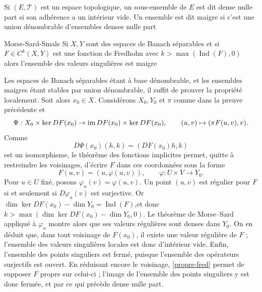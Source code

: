 \documentclass[memoire.tex]{subfiles}
\begin{document}
\begin{definition}
    Si $(E,\mathcal{T})$ est un espace topologique, un sous-ensemble de $E$ est dit \textcolor{color-def}{dense nulle part} si son adhérence  a un intérieur vide. Un ensemble est dit \textcolor{color-def}{maigre} si c'est une union dénombrable d'ensembles denses nulle part
\end{definition}
\begin{theobox}{Morse-Sard-Smale}{}
    Si $X,Y$ sont des espaces de Banach séparables et si $F\in C^k(X,Y)$ est une fonction de 
    Fredholm avec $k>\max(\operatorname*{Ind}(F),0)$
    alors l'ensemble des valeurs singulières est maigre
\end{theobox}
\begin{preuve}
Les espaces de Banach séparables étant à base dénombrable, et les ensembles maigres étant stables par union dénombrable, il suffit de prouver la propriété localement. Soit alors $x_0\in X$.  Considérons $X_0,Y_0$ et $\pi$ comme dans la preuve précédente et 
\begin{equation*}
    \Psi:X_0\times\ker DF(x_0)\rightarrow
    \operatorname{im} DF(x_0)\times\ker DF(x_0),\qquad
    (u,v)\mapsto(\pi F(u,v),v).
\end{equation*}
Comme
\begin{equation*}
    D\Psi(x_0)(h,k)=(DF(x_0)h,k)
\end{equation*}
est un isomorphisme, le théorème des fonctions implicites permet, quitte à restreindre les voisinages, d'écrire $F$ dans ces coordonnées sous la forme
\begin{equation*}
    F(u,v)=(u,\varphi(u,v)),
    \qquad
    \varphi:U\times V\rightarrow Y_0.
\end{equation*}
Pour $u\in U$ fixé, posons $\varphi_u(v)=\varphi(u,v)$. Un point $(u,v)$ est régulier pour $F$ si et seulement si $D\varphi_u(v)$ est surjective. Or $\dim\ker DF(x_0)-\dim Y_0=\operatorname{Ind}(F)$,et donc $k>\max(\dim\ker DF(x_0)-\dim Y_0,0)$. Le théorème de Morse--Sard appliqué à $\varphi_u$ montre alors que ses valeurs régulières sont denses dans $Y_0$. On en déduit que, dans tout voisinage de $F(x_0)$, il existe une valeur régulière de $F$ ; l'ensemble des valeurs singulières locales est donc d'intérieur vide. Enfin, l'ensemble des points singuliers est fermé, puisque l'ensemble des opérateurs surjectifs est ouvert. En réduisant encore le voisinage, \ref{propre-fred} permet de supposer $F$ propre sur celui-ci ; l'image de l'ensemble des points singuliers y est donc fermée, et par ce qui précède dense nulle part.
\end{preuve}
\end{document}
